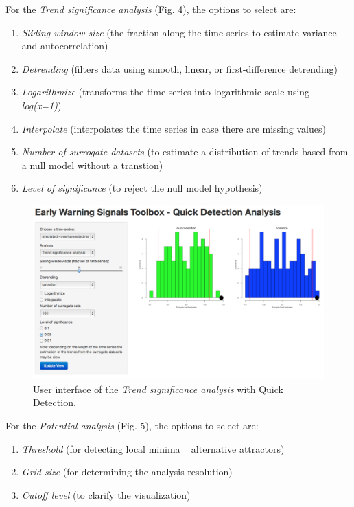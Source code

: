 \documentclass[12pt,a4paper,final]{article}
\begin{document}
\begin{doublespacing}
\newpage
For the \textit{Trend significance analysis} (Fig. 4), the options to select are:
\begin{enumerate}
\item \textit{Sliding window size} (the fraction along the time series to estimate variance and autocorrelation)
\item  \textit{Detrending} (filters data using smooth, linear, or first-difference detrending)
\item \textit{Logarithmize} (transforms the time series into logarithmic scale using \textit{log(x=1)})
\item \textit{Interpolate} (interpolates the time series in case there are missing values)
\item \textit{Number of surrogate datasets} (to estimate a distribution of trends based from a null model without a transtion)
\item \textit{Level of significance} (to reject the null model hypothesis)
\end{enumerate}

\begin{figure}[ht]
\begin{center}
\includegraphics[scale=0.4]{demo_significance2.png}
\caption{User interface of the \textit{Trend significance analysis} with Quick Detection.}
\end{center}
\end{figure}
\newpage
For the \textit{Potential analysis} (Fig. 5), the options to select are:
\begin{enumerate}
\item \textit{Threshold} (for detecting local minima ~ alternative attractors)
\item \textit{Grid size} (for determining the analysis resolution)
\item \textit{Cutoff level} (to clarify the visualization)
\end{enumerate}


\end{doublespacing}
\end{document}
